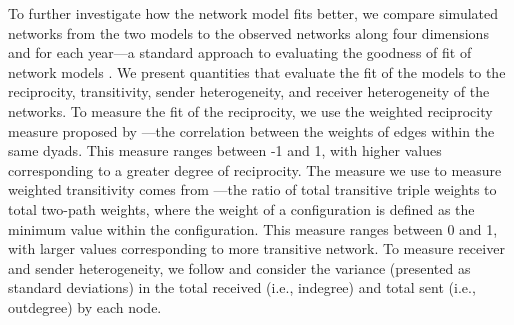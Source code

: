 \documentclass[reqno,onecolumn,letterpaper,12pt]{article}
\begin{document}
To further investigate how the network model fits better, we compare simulated networks from the two models to the observed networks along four dimensions and for each year---a standard approach to evaluating the goodness of fit of network models \citep{hunter2008goodness}. We present quantities that evaluate the fit of the models to the reciprocity, transitivity, sender heterogeneity, and receiver heterogeneity of the networks. To measure the fit of the reciprocity, we use the weighted reciprocity measure proposed by \cite{garlaschelli2004patterns}---the correlation between the weights of edges within the same dyads. This measure ranges between -1 and 1, with higher values corresponding to a greater degree of reciprocity.  The measure we use to measure weighted transitivity comes from \cite{opsahl2009clustering}---the ratio of total transitive triple weights to total two-path weights, where the weight of a configuration is defined as the minimum value within the configuration. This measure ranges between 0 and 1, with larger values corresponding to more transitive network.  To measure receiver and sender heterogeneity, we follow \citet{minhas2019inferential} and consider the variance (presented as standard deviations) in the total received (i.e., indegree) and total sent (i.e., outdegree) by each node.
\end{document}
